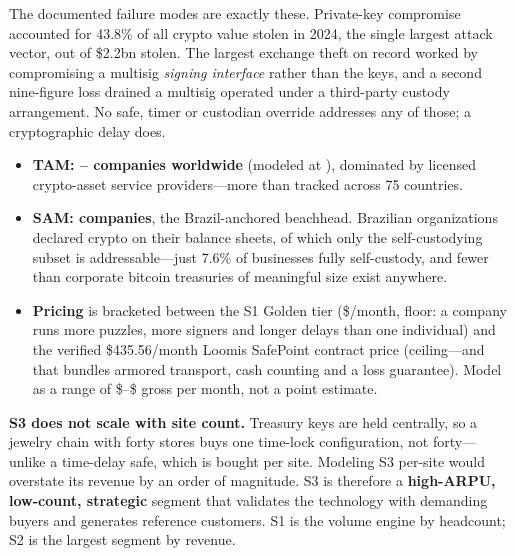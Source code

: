 \noindent The documented failure modes are exactly these. Private-key compromise
accounted for \num[round-precision=1]{43.8}\% of all crypto value stolen in 2024, the
single largest attack vector, out of \$\num[round-precision=1]{2.2}bn
stolen\cite{chainalysis2025hacks}. The largest exchange theft on record worked by
compromising a multisig \emph{signing interface} rather than the keys, and a second
nine-figure loss drained a multisig operated under a third-party custody
arrangement\cite{wazirx2024hack}. No safe, timer or custodian override addresses any
of those; a cryptographic delay does.

\begin{itemize}[nosep]
  \item \textbf{TAM: \numint{\tamSegThreeCompaniesLow}--\numint{\tamSegThreeCompaniesHigh}
    companies worldwide} (modeled at \numint{\tamSegThreeCompanies}), dominated by
    licensed crypto-asset service providers---more than  tracked across
    75 countries\cite{thebanks2025vasp}.
  \item \textbf{SAM: \numint{\samSegThreeCompanies} companies}, the Brazil-anchored
    beachhead.  Brazilian organizations declared crypto on their balance
    sheets\cite{receita2022cripto}, of which only the self-custodying subset is
    addressable---just \num[round-precision=1]{7.6}\% of businesses fully self-custody,
    and fewer than  corporate bitcoin treasuries of meaningful size exist
    anywhere\cite{river2025business}.
  \item \textbf{Pricing} is bracketed between the S1 Golden tier
    (\$\numint{\subGoldenPrice}/month, floor: a company runs more puzzles, more
    signers and longer delays than one individual) and the verified
    \$\num[round-precision=2]{435.56}/month Loomis SafePoint contract price
    (ceiling---and that bundles armored transport, cash counting and a loss
    guarantee)\cite{loomis2016safepoint}. Model as a range of
    \$\numint{\arpuSegThreeGrossMonthlyLow}--\$\numint{\arpuSegThreeGrossMonthlyHigh}
    gross per month, not a point estimate.
\end{itemize}

\noindent\textbf{S3 does not scale with site count.} Treasury keys are held centrally,
so a jewelry chain with forty stores buys one time-lock configuration, not forty---%
unlike a time-delay safe, which is bought per site. Modeling S3 per-site would
overstate its revenue by an order of magnitude. S3 is therefore a \textbf{high-ARPU,
low-count, strategic} segment that validates the technology with demanding buyers and
generates reference customers. S1 is the volume engine by headcount; S2 is the largest segment by revenue.

